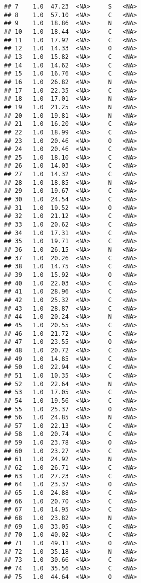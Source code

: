 \documentclass[
]{article}
\begin{document}
\begin{verbatim}
## 7    1.0  47.23  <NA>     S   <NA>
## 8    1.0  57.10  <NA>     C   <NA>
## 9    1.0  18.86  <NA>     N   <NA>
## 10   1.0  18.44  <NA>     C   <NA>
## 11   1.0  17.92  <NA>     C   <NA>
## 12   1.0  14.33  <NA>     O   <NA>
## 13   1.0  15.82  <NA>     C   <NA>
## 14   1.0  14.62  <NA>     C   <NA>
## 15   1.0  16.76  <NA>     C   <NA>
## 16   1.0  26.82  <NA>     N   <NA>
## 17   1.0  22.35  <NA>     C   <NA>
## 18   1.0  17.01  <NA>     N   <NA>
## 19   1.0  21.25  <NA>     N   <NA>
## 20   1.0  19.81  <NA>     N   <NA>
## 21   1.0  16.20  <NA>     C   <NA>
## 22   1.0  18.99  <NA>     C   <NA>
## 23   1.0  20.46  <NA>     O   <NA>
## 24   1.0  20.46  <NA>     C   <NA>
## 25   1.0  18.10  <NA>     C   <NA>
## 26   1.0  14.03  <NA>     C   <NA>
## 27   1.0  14.32  <NA>     C   <NA>
## 28   1.0  18.85  <NA>     N   <NA>
## 29   1.0  19.67  <NA>     C   <NA>
## 30   1.0  24.54  <NA>     C   <NA>
## 31   1.0  19.52  <NA>     O   <NA>
## 32   1.0  21.12  <NA>     C   <NA>
## 33   1.0  20.62  <NA>     C   <NA>
## 34   1.0  17.31  <NA>     C   <NA>
## 35   1.0  19.71  <NA>     C   <NA>
## 36   1.0  26.15  <NA>     N   <NA>
## 37   1.0  20.26  <NA>     C   <NA>
## 38   1.0  14.75  <NA>     C   <NA>
## 39   1.0  15.92  <NA>     O   <NA>
## 40   1.0  22.03  <NA>     C   <NA>
## 41   1.0  28.96  <NA>     C   <NA>
## 42   1.0  25.32  <NA>     C   <NA>
## 43   1.0  28.87  <NA>     C   <NA>
## 44   1.0  20.24  <NA>     N   <NA>
## 45   1.0  20.55  <NA>     C   <NA>
## 46   1.0  21.72  <NA>     C   <NA>
## 47   1.0  23.55  <NA>     O   <NA>
## 48   1.0  20.72  <NA>     C   <NA>
## 49   1.0  14.85  <NA>     C   <NA>
## 50   1.0  22.94  <NA>     C   <NA>
## 51   1.0  10.35  <NA>     C   <NA>
## 52   1.0  22.64  <NA>     N   <NA>
## 53   1.0  17.05  <NA>     C   <NA>
## 54   1.0  19.56  <NA>     C   <NA>
## 55   1.0  25.37  <NA>     O   <NA>
## 56   1.0  24.85  <NA>     N   <NA>
## 57   1.0  22.13  <NA>     C   <NA>
## 58   1.0  20.74  <NA>     C   <NA>
## 59   1.0  23.78  <NA>     O   <NA>
## 60   1.0  23.27  <NA>     C   <NA>
## 61   1.0  24.92  <NA>     N   <NA>
## 62   1.0  26.71  <NA>     C   <NA>
## 63   1.0  27.23  <NA>     C   <NA>
## 64   1.0  23.37  <NA>     O   <NA>
## 65   1.0  24.88  <NA>     C   <NA>
## 66   1.0  20.70  <NA>     C   <NA>
## 67   1.0  14.95  <NA>     C   <NA>
## 68   1.0  23.82  <NA>     N   <NA>
## 69   1.0  33.05  <NA>     C   <NA>
## 70   1.0  40.02  <NA>     C   <NA>
## 71   1.0  49.11  <NA>     O   <NA>
## 72   1.0  35.18  <NA>     N   <NA>
## 73   1.0  30.66  <NA>     C   <NA>
## 74   1.0  35.56  <NA>     C   <NA>
## 75   1.0  44.64  <NA>     O   <NA>

\end{verbatim}
\end{document}
